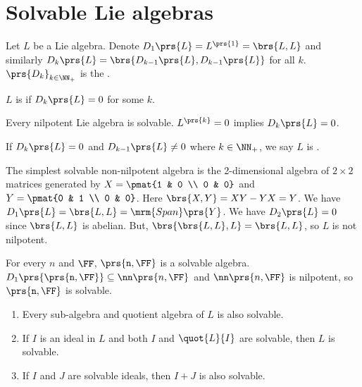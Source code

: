 \documentclass[10pt,a4paper,twoside,openany,hidelinks]{book}
\begin{document}
\section{Solvable Lie algebras}
\begin{definition}
Let $L$ be a Lie algebra.
Denote $D_1\prs{L} = L^{\prs{1}} = \brs{L,L}$ and similarly $D_k\prs{L} = \brs{D_{k-1}\prs{L}, D_{k-1}\prs{L}}$ for all $k$.
$\prs{D_k}_{k\in\NN_+}$ is the .
\end{definition}
\begin{definition}
$L$ is  if $D_k\prs{L} = 0$ for some $k$.
\end{definition}
\begin{remark}
Every nilpotent Lie algebra is solvable. $L^{\prs{k}} = 0$ implies $D_k\prs{L} = 0$.
\end{remark}
\begin{definition}
If $D_k\prs{L} = 0$ and $D_{k-1}\prs{L} \neq 0$ where $k \in \NN_+$, we say $L$ is .
\end{definition}
\begin{example}
The simplest solvable non-nilpotent algebra is the 2-dimensional algebra of $2\times 2$ matrices generated by
$X = \pmat{1 & 0 \\ 0 & 0}$ and $Y = \pmat{0 & 1 \\ 0 & 0}$.
Here $\brs{X,Y} = XY - YX = Y$.
We have $D_1\prs{L} = \brs{L,L} = \mrm{Span}\prs{Y}$. We have $D_2\prs{L} = 0$ since $\brs{L,L}$ is abelian. But, $\brs{\brs{L,L},L} = \brs{L,L}$, so $L$ is not nilpotent.
\end{example}
\begin{example}
For every $n$ and $\FF$, $\tt\prs{n,\FF}$ is a solvable algebra.
$D_1\prs{\tt\prs{n,\FF}} \subseteq \nn\prs{n,\FF}$ and $\nn\prs{n,\FF}$ is nilpotent, so $\tt\prs{n,\FF}$ is solvable.
\end{example}
\begin{proposition}
\begin{enumerate}
\item Every sub-algebra and quotient algebra of $L$ is also solvable. \label{quot solvable}
\item If $I$ is an ideal in $L$ and both $I$ and $\quot{L}{I}$ are solvable, then $L$ is solvable. \label{quot ideal solvable}
\item If $I$ and $J$ are solvable ideals, then $I + J$ is also solvable. \label{sum solvable}
\end{enumerate}
\end{proposition}
\end{document}
